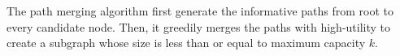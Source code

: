 The path merging algorithm first generate the informative paths from root to every candidate node. Then, it greedily merges the paths with high-utility to create a subgraph whose size is less than or equal to maximum capacity $k$.

